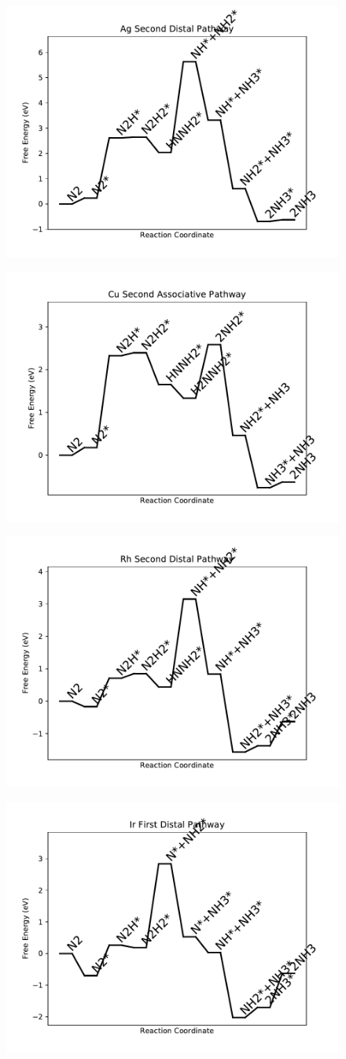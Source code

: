 \documentclass[journal=jacsat,manuscript=article]{achemso}
\begin{document}
\newpage
\begin{figure}
\includegraphics[width=0.5\linewidth]{data/plots/Ag_distal_2.pdf}
\label{fig:Ag_distal_2}
\end{figure}

\begin{figure}
\includegraphics[width=0.5\linewidth]{data/plots/Cu_associative_2.pdf}
\label{fig:Cu_associative_2}
\end{figure}

\newpage
\begin{figure}
\includegraphics[width=0.5\linewidth]{data/plots/Rh_distal_2.pdf}
\label{fig:Rh_distal_2}
\end{figure}

\begin{figure}
\includegraphics[width=0.5\linewidth]{data/plots/Ir_distal_1.pdf}
\label{fig:Ir_distal_1}
\end{figure}
\end{document}
